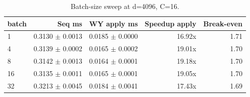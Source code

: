 \begin{table}[t]
  \centering
  \caption{Batch-size sweep at d=4096, C=16.}
  \label{tab:sweep-batch}
  \begin{tabular}{lrrrr}
    \hline
    batch & Seq ms & WY apply ms & Speedup apply & Break-even \\
    \hline
    1 & 0.3130 $\pm$ 0.0013 & 0.0185 $\pm$ 0.0000 & 16.92x & 1.71 \\
    4 & 0.3139 $\pm$ 0.0002 & 0.0165 $\pm$ 0.0002 & 19.01x & 1.70 \\
    8 & 0.3142 $\pm$ 0.0013 & 0.0164 $\pm$ 0.0001 & 19.18x & 1.70 \\
    16 & 0.3135 $\pm$ 0.0011 & 0.0165 $\pm$ 0.0001 & 19.05x & 1.70 \\
    32 & 0.3213 $\pm$ 0.0045 & 0.0184 $\pm$ 0.0041 & 17.43x & 1.69 \\
    \hline
  \end{tabular}
\end{table}
